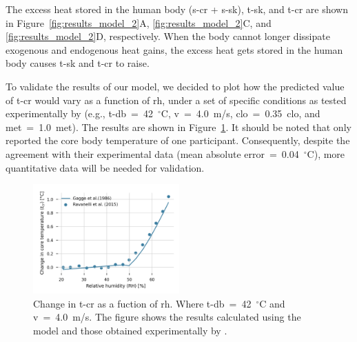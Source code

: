 The excess heat stored in the human body (\acs{s-cr} + \acs{s-sk}), \ac{t-sk}, and \ac{t-cr} are shown in Figure~\ref{fig:results_model_2}A, \ref{fig:results_model_2}C, and \ref{fig:results_model_2}D, respectively.
When the body cannot longer dissipate exogenous and endogenous heat gains, the excess heat gets stored in the human body causes \ac{t-sk} and \ac{t-cr} to raise.


To validate the results of our model, we decided to plot how the predicted value of \ac{t-cr} would vary as a function of \ac{rh}, under a set of specific conditions as tested experimentally by  (e.g., \ac{t-db}~=~42~$^{\circ}$C, \ac{v}~=~4.0~m/s, \ac{clo}~=~0.35~clo, and \ac{met}~=~1.0~met).
The results are shown in Figure~\ref{fig:comparison_ravanelli}.
It should be noted that  only reported the core body temperature of one participant.
Consequently, despite the agreement with their experimental data (mean absolute error~=~0.04~$^{\circ}$C), more quantitative data will be needed for validation.

\begin{figure}[thb!]
    \centering
    \includegraphics[width=0.5\textwidth]{figures/comparison_ravanelli}
    \caption{Change in \acf{t-cr} as a fuction of \acf{rh}.
    Where \ac{t-db}~=~42~$^{\circ}$C and \ac{v}~=~4.0~m/s.
    The figure shows the results calculated using the  model and those obtained experimentally by .}
    \label{fig:comparison_ravanelli}
\end{figure}


